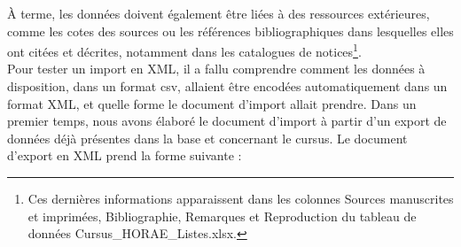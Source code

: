 \documentclass[a4paper,12pt,twoside]{book}
\begin{document}
	À terme, les données doivent également être liées à des ressources extérieures, comme les cotes des sources ou les références bibliographiques dans lesquelles elles ont citées et décrites, notamment dans les catalogues de notices\footnote{Ces dernières informations apparaissent dans les colonnes \og Sources manuscrites et imprimées\fg{}, \og Bibliographie\fg{}, \og Remarques\fg{} et \og Reproduction\fg{} du tableau de données \og Cursus\_HORAE\_Listes.xlsx\fg{}.}. \\
	
	Pour tester un import en XML, il a fallu comprendre comment les données à disposition, dans un format csv, allaient être encodées automatiquement dans un format XML, et quelle forme le document d'import allait prendre. Dans un premier temps, nous avons élaboré le document d'import à partir d'un export de données déjà présentes dans la base et concernant le cursus. Le document d'export en XML prend la forme suivante : 
\end{document}
